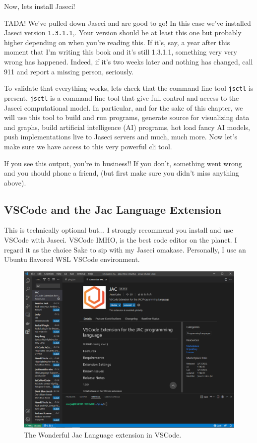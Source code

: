 Now, lets install Jaseci!
\par
{}

TADA! We've pulled down Jaseci and are good to go! In this case we've installed Jaseci version \texttt{1.3.1.1},. Your version should be at least this one but probably higher depending on when you're reading this. If it's, say, a year after this moment that I'm writing this book and it's still 1.3.1.1, something very very wrong has happened. Indeed, if it's two weeks later and nothing has changed, call 911 and report a missing person, seriously.

To validate that everything works, lets check that the command line tool \texttt{jsctl} is present. \texttt{jsctl} is a command line tool that give full control and access to the Jaseci computational model. In particular, and for the sake of this chapter, we will use this tool to build and run programs, generate source for visualizing data and graphs, build artificial intelligence (AI) programs, hot load fancy AI models, push implementations live to Jaseci servers and much, much more. Now let's make sure we have access to this very powerful cli tool.

\par
{}

If you see this output, you're in business!! If you don't, something went wrong and you should phone a friend, (but first make sure you didn't miss anything above).

\subsection{VSCode and the Jac Language Extension}

This is technically optional but... I strongly recommend you install and use VSCode with Jaseci. VSCode \gls{IMHO}, is the best code editor on the planet. I regard it as the choice Sake to sip with my Jaseci omakase. Personally, I use an Ubuntu flavored \gls{WSL} VSCode environment.

\begin{figure}
    \centering
    \includegraphics[width=.7\linewidth]{assets/images/vscode_jac_plugin.png}
    \caption[]{The Wonderful Jac Language extension in VSCode.}
    \label{fig:vscode_jac}
\end{figure}

